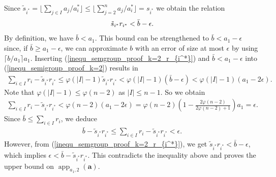 \documentclass[pdflatex]{sn-jnl}
\DeclareMathOperator{\app}{app}
\newcommand{\ba}{\bm{a}}
\theoremstyle{thmstyleone}%
\theoremstyle{thmstyletwo}%
\theoremstyle{thmstylethree}%
\begin{document}
	Since $\tilde{s}_{i^*} =\lfloor \sum_{j\in I} a_j / a_i^* \rfloor\leq  \lfloor \sum_{j=2}^na_j/a_i^*\rfloor = s_{i^*}$ we obtain the relation 
	\begin{align}
		\label{inequ_semgroup_proof_k=2_r_{i^*}}
		\tilde{s}_{i^*}r_{i^*} < \bar{b} - \epsilon.
	\end{align}
	By definition, we have $\bar{b} < a_1$. This bound can be strengthened to $\bar{b} < a_1 - \epsilon$ since, if $\bar{b}\geq a_1 - \epsilon$, we can approximate $b$ with an error of size at most $\epsilon$ by using $\lceil b/a_1 \rceil a_1$. Inserting (\ref{inequ_semgroup_proof_k=2_r_{i^*}}) and $\bar{b} < a_1 - \epsilon$ into (\ref{inequ_semigroup_proof_k=2}) results in
	\begin{align*}
		\sum_{i\in I}r_i - \tilde{s}_{i^*}r_{i^*}\leq \varphi(|I| - 1) \tilde{s}_{i^*}r_{i^*} < \varphi(|I| - 1)\left(\bar{b} - \epsilon\right) < \varphi(|I| - 1) (a_1 - 2\epsilon).
	\end{align*}
	Note that $\varphi(|I| - 1)\leq \varphi(n - 2)$ as $|I|\leq n- 1$. So we obtain
	\begin{align*}
		\sum_{i\in I}r_i - \tilde{s}_{i^*}r_{i^*} < \varphi(n - 2)(a_1 - 2\epsilon) = \varphi(n - 2)\left( 1 - \frac{2\varphi(n - 2)}{2\varphi(n - 2) + 1}\right)a_1 = \epsilon.
	\end{align*}
	Since $\bar{b} \leq \sum_{i\in I}r_i$, we deduce
	\begin{align*}
		\bar{b} - \tilde{s}_{i^*}r_{i^*} \leq\sum_{i\in I}r_i - \tilde{s}_{i^*}r_{i^*}< \epsilon.
	\end{align*}
	However, from (\ref{inequ_semgroup_proof_k=2_r_{i^*}}), we get $\tilde{s}_{i^*}r_{i^*} < \bar{b} - \epsilon$, which implies $\epsilon < \bar{b} - \tilde{s}_{i^*}r_{i^*}$. This contradicts the inequality above and proves the upper bound on $\app_{a_1,2}(\ba)$.
	
	
\end{document}
